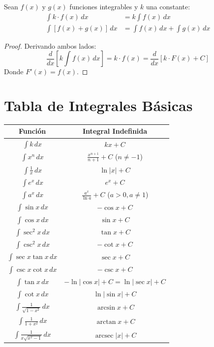 \documentclass[12pt, a4paper]{book}
\begin{document}
\begin{proposicion}[Linealidad]
Sean $f(x)$ y $g(x)$ funciones integrables y $k$ una constante:
\begin{align}
\int k \cdot f(x) \, dx &= k \int f(x) \, dx \\
\int [f(x) + g(x)] \, dx &= \int f(x) \, dx + \int g(x) \, dx
\end{align}
\end{proposicion}

\begin{proof}
Derivando ambos lados:
\[
\frac{d}{dx}\left[k \int f(x) \, dx\right] = k \cdot f(x) = \frac{d}{dx}\left[k \cdot F(x) + C\right]
\]
Donde $F'(x) = f(x)$.
\end{proof}

\section{Tabla de Integrales Básicas}

\begin{table}[h]
\centering
\begin{tabular}{|c|c|}
\hline
\textbf{Función} & \textbf{Integral Indefinida} \\
\hline
$\int k \, dx$ & $kx + C$ \\
$\int x^n \, dx$ & $\frac{x^{n+1}}{n+1} + C$ \quad ($n \neq -1$) \\
$\int \frac{1}{x} \, dx$ & $\ln|x| + C$ \\
$\int e^x \, dx$ & $e^x + C$ \\
$\int a^x \, dx$ & $\frac{a^x}{\ln a} + C$ \quad ($a > 0, a \neq 1$) \\
$\int \sin x \, dx$ & $-\cos x + C$ \\
$\int \cos x \, dx$ & $\sin x + C$ \\
$\int \sec^2 x \, dx$ & $\tan x + C$ \\
$\int \csc^2 x \, dx$ & $-\cot x + C$ \\
$\int \sec x \tan x \, dx$ & $\sec x + C$ \\
$\int \csc x \cot x \, dx$ & $-\csc x + C$ \\
$\int \tan x \, dx$ & $-\ln|\cos x| + C = \ln|\sec x| + C$ \\
$\int \cot x \, dx$ & $\ln|\sin x| + C$ \\
$\int \frac{1}{\sqrt{1-x^2}} \, dx$ & $\arcsin x + C$ \\
$\int \frac{1}{1+x^2} \, dx$ & $\arctan x + C$ \\
$\int \frac{1}{x\sqrt{x^2-1}} \, dx$ & $\operatorname{arcsec}|x| + C$ \\
\hline
\end{tabular}
\end{table}
\end{document}
